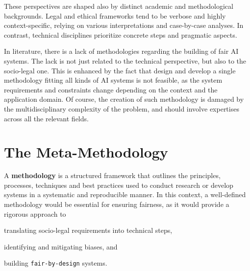 \documentclass[12pt,a4paper,openright,twoside]{book}
\begin{document}

These perspectives are shaped also by distinct academic and methodological backgrounds.
%
Legal and ethical frameworks tend to be verbose and highly context-specific, relying on various interpretations and case-by-case analyses.
%
In contrast, technical disciplines prioritize concrete steps and pragmatic aspects.


In literature, there is a lack of methodologies regarding the building of fair \ac{AI} systems. The lack is not just related to the technical perspective, but also to the socio-legal one.
%
This is enhanced by the fact that design and develop a single methodology fitting all kinds of \ac{AI} systems is not feasible, as the system requirements and constraints change depending on the context and the application domain.
%
Of course, the creation of such methodology is damaged by the multidisciplinary complexity of the problem, and should involve expertises across all the relevant fields.





% 


\chapter{The Meta-Methodology}\label{chap:meta-methodology}


A \textbf{methodology} is a structured framework that outlines the principles, processes, techniques and best practices used to conduct research or develop systems in a systematic and reproducible manner.
%
In this context, a well-defined methodology would be essential for ensuring fairness, as it would provide a rigorous approach to
\begin{enumerate*}[label=(\roman*)]
    \item translating socio-legal requirements into technical steps,
    \item identifying and mitigating biases, and
    \item building \texttt{fair-by-design} systems.
\end{enumerate*}
\end{document}
